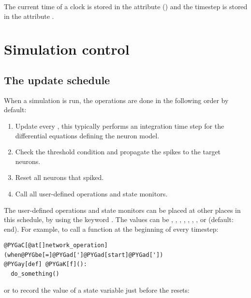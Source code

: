 \documentclass[letterpaper,10pt]{manual}
\begin{document}
The current time of a clock is stored in the attribute  () and
the timestep is stored in the attribute .

\resetcurrentobjects
{}

\hypertarget{index-98}{}\section{Simulation control}

\hypertarget{index-99}{}\subsection{The update schedule}

When a simulation is run, the operations are done in the following order by default:
\begin{enumerate}
\item {} 
Update every \hyperlink{brian.NeuronGroup}{}, this typically performs an integration time step for the differential equations defining the neuron model.

\item {} 
Check the threshold condition and propagate the spikes to the target neurons.

\item {} 
Reset all neurons that spiked.

\item {} 
Call all user-defined operations and state monitors.

\end{enumerate}

The user-defined operations and state monitors can be placed at other places in this schedule, by
using the keyword . The values can be , , ,
, , , ,  or
 (default: end). For example, to call a function  at the beginning of every timestep:

\begin{Verbatim}[commandchars=@\[\]]
@PYGaC[@at[]network_operation](when@PYGbe[=]@PYGad[']@PYGad[start]@PYGad['])
@PYGay[def] @PYGaK[f]():
  do_something()
\end{Verbatim}

or to record the value of a state variable just before the resets:
\end{document}
